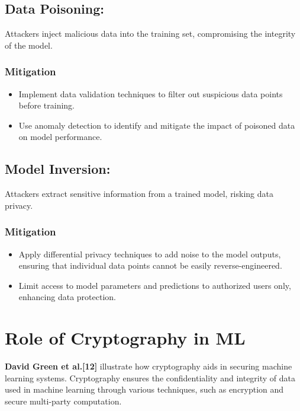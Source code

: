 \documentclass[oneside,a4paper,12pt]{report}
\begin{document}
\subsection{Data Poisoning:} Attackers inject malicious data into the training set, compromising the integrity of the model.
\subsubsection{Mitigation}
\begin{itemize}
    \item Implement data validation techniques to filter out suspicious data points before training.
    \item Use anomaly detection to identify and mitigate the impact of poisoned data on model performance.
\end{itemize}

\vspace*{1\baselineskip}
\subsection{Model Inversion:} Attackers extract sensitive information from a trained model, risking data privacy.
\subsubsection{Mitigation}
\begin{itemize}
    \item Apply differential privacy techniques to add noise to the model outputs, ensuring that individual data points cannot be easily reverse-engineered.
    \item Limit access to model parameters and predictions to authorized users only, enhancing data protection.
\end{itemize}

\vspace*{2\baselineskip}

\section{Role of Cryptography in ML}
\textbf{David Green et al.[12]} illustrate how cryptography aids in securing machine learning systems.
\newline Cryptography ensures the confidentiality and integrity of data used in machine learning through various techniques, such as encryption and secure multi-party computation.
\end{document}

